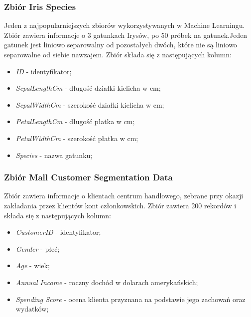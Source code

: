 \documentclass{classrep}
\begin{document}
{{            \subsubsection{Zbiór Iris Species}
            \label{opis_zbiorow_intro_iris} {
                Jeden z najpopularniejszych zbiorów wykorzystywanych w Machine
                Learningu. Zbiór zawiera informacje o 3 gatunkach Irysów, po 50 próbek
                na gatunek.Jeden gatunek jest liniowo separowalny od pozostałych dwóch,
                które nie są liniowo separowalne od siebie nawzajem. Zbiór składa się z
                następujących kolumn:
                \begin{itemize}
                    \item \textit{ID} - identyfikator;
                    \item \textit{SepalLengthCm} - długość działki kielicha w cm;
                    \item \textit{SepalWidthCm} - szerokość działki kielicha w cm;
                    \item \textit{PetalLengthCm} - długość płatka w cm;
                    \item \textit{PetalWidthCm} - szerokość płatka w cm;
                    \item \textit{Species} - nazwa gatunku;
                \end{itemize}
            }

            \subsubsection{Zbiór Mall Customer Segmentation Data}
            \label{opis_zbiorow_intro_customers} {
                Zbiór zawiera informacje o klientach centrum handlowego, zebrane przy
                okazji zakładania przez klientów kont członkowskich. Zbiór zawiera 200
                rekordów i składa się z następujących kolumn:
                \begin{itemize}
                    \item \textit{CustomerID} - identyfikator;
                    \item \textit{Gender} - płeć;
                    \item \textit{Age} - wiek;
                    \item \textit{Annual Income} - roczny dochód w dolarach amerykańskich;
                    \item \textit{Spending Score} - ocena klienta przyznana na podstawie jego zachowań oraz wydatków;
                \end{itemize}
            }

}}
\end{document}
